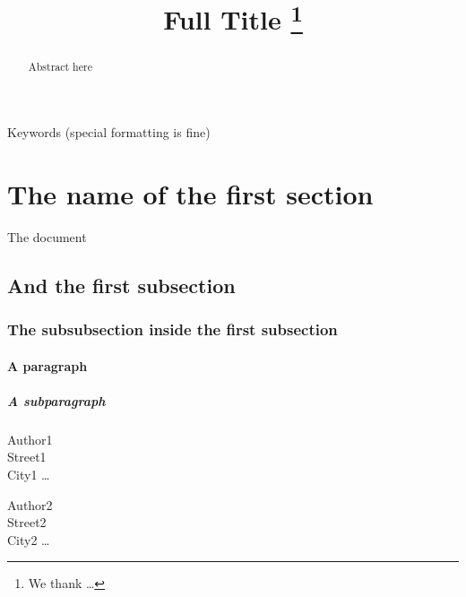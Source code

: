 \documentclass{sp}
\title[Short title]{Full Title \thanks{We thank \ldots}}
\author[Short author]{%
  \spauthor{Author1 \\ \institute{Institute1}} \AND
  \spauthor{Author2 \\ \institute{Institute2}} \AND
  \spauthor{Author3 \\ \institute{Institute3}}%
}
\begin{document}
\maketitle

\begin{abstract}
  Abstract here
\end{abstract}

\begin{keywords}
  Keywords (special formatting is fine)
\end{keywords}

\section{The name of the first section}

The document

\subsection{And the first subsection}

\subsubsection{The subsubsection inside the first subsection}

\paragraph{A paragraph}

\subparagraph{A subparagraph}



\begin{addresses}
  \begin{address}
    Author1 \\
    Street1 \\
    City1 \ldots \\
  \end{address}
  \begin{address}
    Author2 \\
    Street2 \\
    City2 \dots \\
  \end{address}
\end{addresses}
\end{document}
